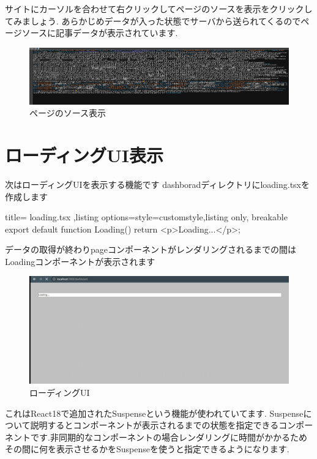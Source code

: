 サイトにカーソルを合わせて右クリックしてページのソースを表示をクリックしてみましょう.
あらかじめデータが入った状態でサーバから送られてくるのでページソースに記事データが表示されています.

\begin{figure}[H]
  \centering
  \includegraphics[width=12cm]{./image/03-Tech/chap4/05.png}
  \caption{ページのソース表示}
\end{figure}

\section{ローディングUI表示}

次はローディングUIを表示する機能です
dashboradディレクトリにloading.tsxを作成します

\begin{tcblisting}{title={
        loading.tsx
      },listing options={style=customstyle},listing only, breakable}
  export default function Loading() {
      return <p>Loading...</p>;
    }
\end{tcblisting}


データの取得が終わりpageコンポーネントがレンダリングされるまでの間はLoadingコンポーネントが表示されます

\begin{figure}[H]
  \centering
  \includegraphics[width=12cm]{./image/03-Tech/chap4/07.png}
  \caption{ローディングUI}
\end{figure}




これはReact18で追加されたSuspenseという機能が使われていてます.
Suspenseについて説明するとコンポーネントが表示されるまでの状態を指定できるコンポーネントです.非同期的なコンポーネントの場合レンダリングに時間がかかるためその間に何を表示させるかをSuspenseを使うと指定できるようになります.


